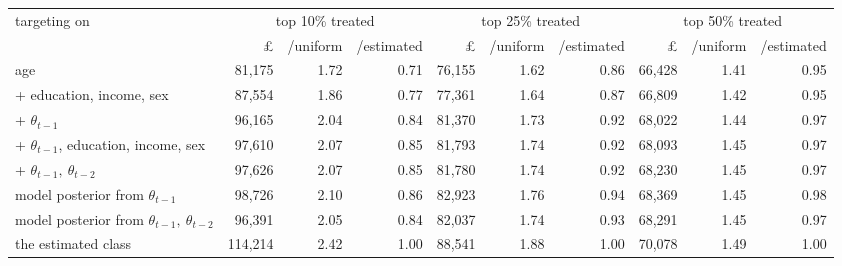 \begin{tabular}{lrrrrrrrrr}
\toprule
targeting on & \multicolumn{3}{c}{top 10\% treated} & \multicolumn{3}{c}{top 25\% treated} & \multicolumn{3}{c}{top 50\% treated} \\
\cmidrule(lr){2-4} \cmidrule(lr){5-7} \cmidrule(lr){8-10}
 & \pounds & /uniform & /estimated & \pounds & /uniform & /estimated & \pounds & /uniform & /estimated \\
\midrule
age & 81,175 & 1.72 & 0.71 & 76,155 & 1.62 & 0.86 & 66,428 & 1.41 & 0.95 \\
+ education, income, sex & 87,554 & 1.86 & 0.77 & 77,361 & 1.64 & 0.87 & 66,809 & 1.42 & 0.95 \\
+ $\theta_{t-1}$ & 96,165 & 2.04 & 0.84 & 81,370 & 1.73 & 0.92 & 68,022 & 1.44 & 0.97 \\
+ $\theta_{t-1}$, education, income, sex & 97,610 & 2.07 & 0.85 & 81,793 & 1.74 & 0.92 & 68,093 & 1.45 & 0.97 \\
+ $\theta_{t-1},\ \theta_{t-2}$ & 97,626 & 2.07 & 0.85 & 81,780 & 1.74 & 0.92 & 68,230 & 1.45 & 0.97 \\
model posterior from $\theta_{t-1}$ & 98,726 & 2.10 & 0.86 & 82,923 & 1.76 & 0.94 & 68,369 & 1.45 & 0.98 \\
model posterior from $\theta_{t-1},\ \theta_{t-2}$ & 96,391 & 2.05 & 0.84 & 82,037 & 1.74 & 0.93 & 68,291 & 1.45 & 0.97 \\
the estimated class & 114,214 & 2.42 & 1.00 & 88,541 & 1.88 & 1.00 & 70,078 & 1.49 & 1.00 \\
\bottomrule
\end{tabular}
